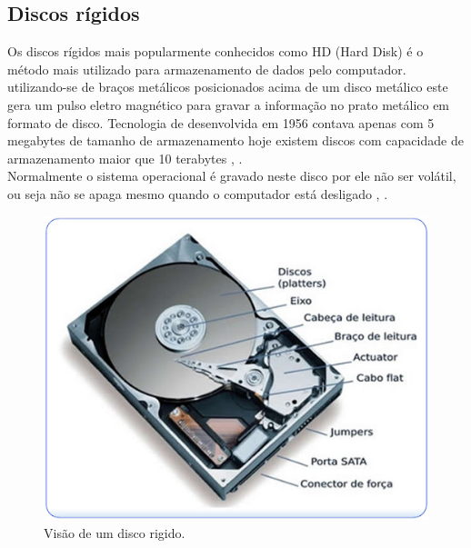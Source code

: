 \subsection{Discos rígidos}
\label{subsection:Discos}
Os discos rígidos mais popularmente conhecidos como HD (Hard Disk) é o método mais utilizado para armazenamento de dados pelo computador. utilizando-se de braços metálicos posicionados acima de um disco metálico este gera um pulso eletro magnético para gravar a informação no prato metálico em formato de disco. Tecnologia de desenvolvida em 1956 contava apenas com 5 megabytes de tamanho de armazenamento hoje existem discos com capacidade de armazenamento maior que 10 terabytes \cite{Tanenbaum2016}, \cite{Comer2012}.\\
Normalmente o sistema operacional é gravado  neste disco por ele não ser volátil, ou seja não se apaga mesmo quando o computador está desligado \cite{Tanenbaum2016}, \cite{Comer2012}.\\

\begin{figure}[htpb]
    \centering
   \includegraphics[scale=0.25]{imagens/disco.jpg}
   \caption{Visão de um disco rigido.}
   \label{fig:disco}
\end{figure}